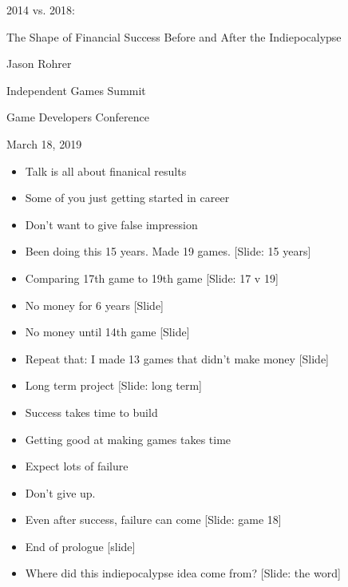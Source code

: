 \documentclass[12pt]{article}
\begin{document}
\begin{center}
2014 vs. 2018:

The Shape of Financial Success Before and After the Indiepocalypse

Jason Rohrer

Independent Games Summit

Game Developers Conference 

March 18, 2019
\end{center}


{\Huge



\begin{itemize}

\item Talk is all about finanical results

\item Some of you just getting started in career

\item Don't want to give false impression

\item Been doing this 15 years.  Made 19 games.  [Slide: 15 years]

\item Comparing 17th game to 19th game [Slide:  17 v 19]

\item No money for 6 years [Slide]

\item No money until 14th game [Slide]

\item Repeat that:  I made 13 games that didn't make money [Slide]

\item Long term project [Slide: long term]

\item Success takes time to build

\item Getting good at making games takes time

\item  Expect lots of failure

\item Don't give up.

\item Even after success, failure can come [Slide: game 18]

\item End of prologue [slide]

\item Where did this indiepocalypse idea come from? [Slide: the word]


\end{itemize}}
\end{document}
